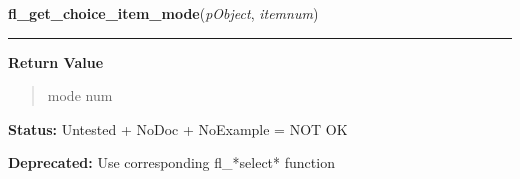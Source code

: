 \hspace{.8\funcindent}\begin{boxedminipage}{\funcwidth}

    \raggedright \textbf{fl\_get\_choice\_item\_mode}(\textit{pObject}, \textit{itemnum})

    \vspace{-1.5ex}

    \rule{\textwidth}{0.5\fboxrule}
\setlength{\parskip}{2ex}
\setlength{\parskip}{1ex}
      \textbf{Return Value}
    \vspace{-1ex}

      \begin{quote}
      mode num

      \end{quote}

\textbf{Status:} Untested + NoDoc + NoExample = NOT OK



\textbf{Deprecated:} Use corresponding fl\_*select* function



    \end{boxedminipage}

    \label{xformslib:library:fl_set_choice_item_mode}

    \vspace{0.5ex}

